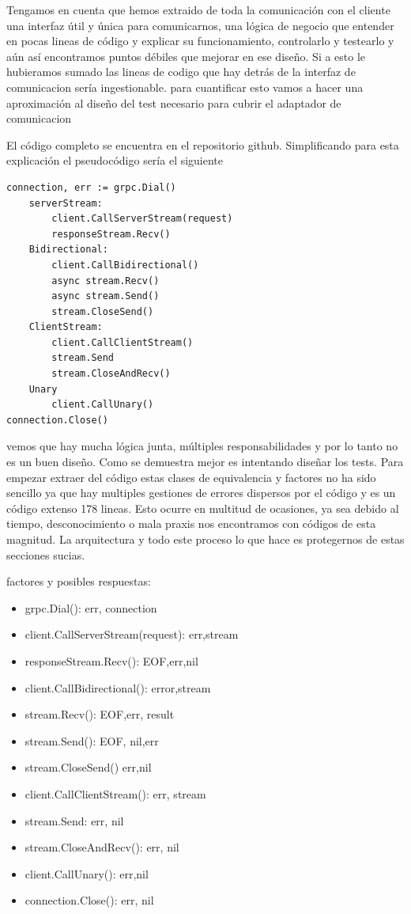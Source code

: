 Tengamos en cuenta que hemos extraido de toda la comunicación con el cliente una interfaz útil y única para comunicarnos, una lógica de negocio que entender en pocas lineas de código y explicar su funcionamiento, controlarlo y testearlo y aún así encontramos puntos débiles que mejorar en ese diseño. Si a esto le hubieramos sumado las lineas de codigo que hay detrás de la interfaz de comunicacion sería ingestionable. para cuantificar esto vamos a hacer una aproximación al diseño del test necesario para cubrir el adaptador de comunicacion

El código completo se encuentra en el repositorio github. Simplificando para esta explicación el pseudocódigo sería el siguiente

\begin{verbatim}
connection, err := grpc.Dial()
    serverStream:
        client.CallServerStream(request)
        responseStream.Recv()
    Bidirectional:
        client.CallBidirectional()
        async stream.Recv()
        async stream.Send()
        stream.CloseSend()
    ClientStream:
        client.CallClientStream()
        stream.Send
        stream.CloseAndRecv()
    Unary
        client.CallUnary()
connection.Close()
\end{verbatim}

vemos que hay mucha lógica junta, múltiples responsabilidades y por lo tanto no es un buen diseño. Como se demuestra mejor es intentando diseñar los tests. Para empezar extraer del código estas clases de equivalencia y factores no ha sido sencillo ya que hay multiples gestiones de errores dispersos por el código y es un código extenso 178 lineas. Esto ocurre en multitud de ocasiones, ya sea debido al tiempo, desconocimiento o mala praxis nos encontramos con códigos de esta magnitud. La arquitectura y todo este proceso lo que hace es protegernos de estas secciones sucias.

factores y posibles respuestas:

\begin{itemize}
    \item grpc.Dial(): err, connection
    \item client.CallServerStream(request): err,stream
    \item responseStream.Recv(): EOF,err,nil
    \item client.CallBidirectional(): error,stream
    \item stream.Recv(): EOF,err, result
    \item stream.Send(): EOF, nil,err
    \item stream.CloseSend() err,nil
    \item client.CallClientStream(): err, stream
    \item stream.Send: err, nil
    \item stream.CloseAndRecv(): err, nil
    \item client.CallUnary(): err,nil
    \item connection.Close(): err, nil
\end{itemize}

